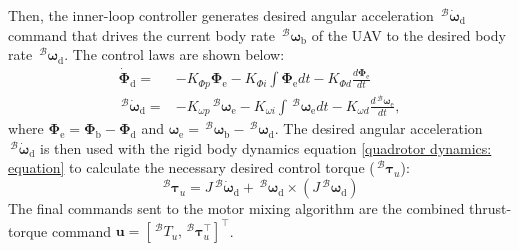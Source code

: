 Then, the inner-loop controller generates desired angular acceleration $\,^\mathcal{B} \dot{\boldsymbol{\omega}}_{\text{d}}$ command that drives the current body rate $\,^\mathcal{B} \boldsymbol{\omega}_{\text{b}}$ of the UAV to the desired body rate $\,^\mathcal{B} \boldsymbol{\omega}_{\text{d}}$.
The control laws are shown below:
\begin{align}
    \dot{\boldsymbol{\Phi}}_{\text{d}} =& - K_{\Phi p} \boldsymbol{\Phi}_{\text{e}} - K_{\Phi i} \int \boldsymbol{\Phi}_{\text{e}} dt - K_{\Phi d} \frac{d\boldsymbol{\Phi}_{\text{e}}}{dt} \nonumber \\
    \,^\mathcal{B} \dot{\boldsymbol{\omega}}_{\text{d}} =& - K_{\omega p} \,^\mathcal{B} \boldsymbol{\omega}_{\text{e}} - K_{\omega i} \int \,^\mathcal{B} \boldsymbol{\omega}_{\text{e}} dt - K_{\omega d} \frac{d\,^\mathcal{B} \boldsymbol{\omega}_{\text{e}}}{dt},
\end{align}
where $\boldsymbol{\Phi}_{\text{e}} = \boldsymbol{\Phi}_{\text{b}} - \boldsymbol{\Phi}_{\text{d}}$ and $\boldsymbol{\omega}_{\text{e}} = \,^\mathcal{B} \boldsymbol{\omega}_{\text{b}} - \,^\mathcal{B} \boldsymbol{\omega}_{\text{d}}$.
The desired angular acceleration $\,^\mathcal{B} \dot{\boldsymbol{\omega}}_{\text{d}}$ is then used with the rigid body dynamics equation \eqref{quadrotor dynamics: equation} to calculate the necessary desired control torque ($\,^\mathcal{B} \boldsymbol{\tau}_u$):
\begin{equation}
\label{tau_des: equation}
    \,^\mathcal{B} \boldsymbol{\tau}_u = J \,^\mathcal{B} \dot{\boldsymbol{\omega}}_{\text{d}} + \,^\mathcal{B} \boldsymbol{\omega}_{\text{d}} \times (J \,^\mathcal{B} \boldsymbol{\omega}_{\text{d}})
\end{equation}
The final commands sent to the motor mixing algorithm are the combined thrust-torque command $\boldsymbol{u} = [\,^\mathcal{B} {T}_u, \,^\mathcal{B} \boldsymbol{\tau}_u^\top]^\top$.
\fi

